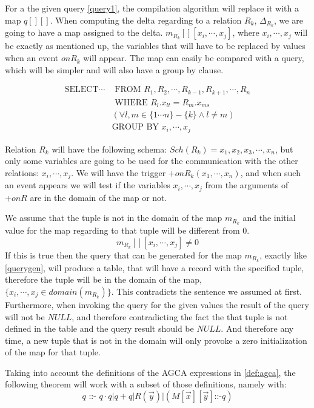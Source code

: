 \documentclass[12pt]{article}
\begin{document}
For a the given query \ref{query1}, the compilation algorithm will replace it with a map $q[][]$. When computing the delta regarding to a relation $R_k$, $\Delta_{R_k}$, we are going to have a map assigned to the delta. $m_{R_k}[][x_i,\cdots,x_j]$, where $x_i,\cdots,x_j$ will be exactly as mentioned up, the variables that will have to be replaced by values when an event $onR_k$ will appear. The map can easily be compared with a query, which will be simpler and will also have a group by clause.

\begin{align}
\text{SELECT}\cdots&\text{ FROM }R_1,R_2,\cdots,R_{k-1},R_{k+1},\cdots,R_n\label{querygen}\\
&\text{ WHERE }R_l.x_{lt}=R_m.x_{ms}\nonumber\\
&(\forall l,m\in\{1\cdots n\}-\{k\}\land l\not=m)\nonumber\\
&\text{GROUP BY } x_i,\cdots,x_j\nonumber
\end{align}
	
Relation $R_k$ will have the following schema: $Sch(R_k)={x_1,x_2,x_3,\cdots,x_n}$, but only some variables are going to be used for the communication with the other relations: $x_i,\cdots,x_j$. We will have the trigger $+onR_k(x_1,\cdots,x_n)$, and when such an event appears we will test if the variables $x_i,\cdots,x_j$ from the arguments of $+onR$ are in the domain of the map or not. 
	
We assume that the tuple is not in the domain of the map $m_{R_k}$ and the initial value for the map regarding to that tuple will be different from 0.
$$m_{R_k}[][x_i,\cdots,x_j]\not= 0$$
If this is true then the query that can be generated for the map $m_{R_k}$, exactly like \ref{querygen},
will produce a table, that will have a record with the specified tuple, therefore the tuple will be in the domain of the map, $\{x_i,\cdots,x_j\in domain(m_{R_k}) \}$. This contradicts the sentence we assumed at first. Furthermore, when invoking the query for the given values the result of the query will not be $NULL$, and therefore contradicting the fact the that tuple is not defined in the table and the query result should be $NULL$. And therefore any time, a new tuple that is not in the domain will only provoke a zero initialization of the map for that tuple.

Taking into account the definitions of the AGCA expressions in \ref{def:agca}, the following theorem will work with a subset of those definitions, namely with:
$$q\text{ ::- }q\cdot q | q + q|R(\vec{y})|(M[\vec{x}][\vec{y}]\text{::-}q)$$
	
\end{document}
